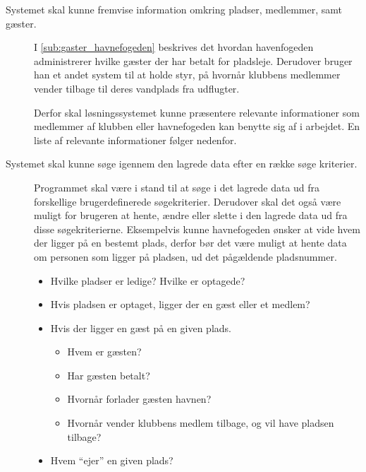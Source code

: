 \begin{description}
  \item[Systemet skal kunne fremvise information omkring pladser, medlemmer, samt gæster.]

  I \cref{sub:gaster_havnefogeden} beskrives det hvordan havenfogeden administrerer hvilke gæster der har betalt for pladsleje. Derudover bruger han et andet system til at holde styr, på hvornår klubbens medlemmer vender tilbage til deres vandplads fra udflugter.

  Derfor skal løsningssystemet kunne præsentere relevante informationer som medlemmer af klubben eller havnefogeden kan benytte sig af i arbejdet. En liste af relevante informationer følger nedenfor.

  \item[Systemet skal kunne søge igennem den lagrede data efter en række søge kriterier.]

Programmet skal være i stand til at søge i det lagrede data ud fra forskellige brugerdefinerede søgekriterier. Derudover skal det også være muligt for brugeren at hente, ændre eller slette i den lagrede data ud fra disse søgekriterierne. Eksempelvis kunne havnefogeden ønsker at vide hvem der ligger på en bestemt plads, derfor bør det være muligt at hente data om personen som ligger på pladsen, ud det pågældende pladsnummer.



  \begin{itemize}
  \item Hvilke pladser er ledige? Hvilke er optagede?
  \item Hvis pladsen er optaget, ligger der en gæst eller et medlem?
  \item Hvis der ligger en gæst på en given plads.
    \begin{itemize}
      \item Hvem er gæsten?
      \item Har gæsten betalt?
      \item Hvornår forlader gæsten havnen?
      \item Hvornår vender klubbens medlem tilbage, og vil have pladsen tilbage?
    \end{itemize}
  \item Hvem \enquote{ejer} en given plads?
  \end{itemize}

\end{description}
